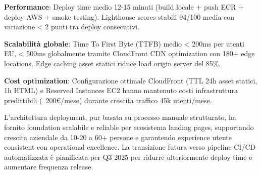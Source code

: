 \textbf{Performance}: Deploy time medio 12-15 minuti (build locale + push ECR + deploy AWS + smoke testing). Lighthouse scores stabili 94/100 media con variazione < 2 punti tra deploy consecutivi.

\textbf{Scalabilità globale}: Time To First Byte (TTFB) medio < 200ms per utenti EU, < 500ms globalmente tramite CloudFront CDN optimization con 180+ edge locations. Edge caching asset statici riduce load origin server del 85\%.

\textbf{Cost optimization}: Configurazione ottimale CloudFront (TTL 24h asset statici, 1h HTML) e Reserved Instances EC2 hanno mantenuto costi infrastruttura predittibili (~200€/mese) durante crescita traffico 45k utenti/mese.

\bigskip
L'architettura deployment, pur basata su processo manuale strutturato, ha fornito foundation scalabile e reliable per ecosistema landing pages, supportando crescita aziendale da 10-20 a 60+ persone e garantendo experience utente consistent con operational excellence. La transizione futura verso pipeline CI/CD automatizzata è pianificata per Q3 2025 per ridurre ulteriormente deploy time e aumentare frequenza release.